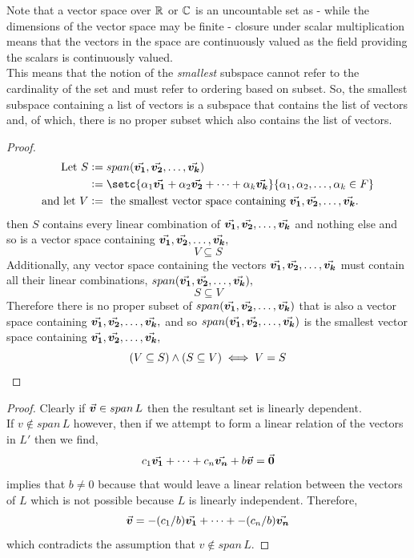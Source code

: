 \documentclass[MathsNotesBase.tex]{subfiles}
\begin{document}
{	\bigskip
	Note that a vector space over $\mathbb{R}^{}$ or $\mathbb{C}^{}$ is an uncountable set as - while the dimensions of the vector space may be finite - closure under scalar multiplication means that the vectors in the space are continuously valued as the field providing the scalars is continuously valued.\\
	This means that the notion of the \emph{smallest} subspace cannot refer to the cardinality of the set and must refer to ordering based on subset. So, the smallest subspace containing a list of vectors is a subspace that contains the list of vectors and, of which, there is no proper subset which also contains the list of vectors.	
	\begin{proof}
		\begin{align*}
		\text{Let } S &:= span(\V{v_1}, \V{v_2}, \dots , \V{v_k})\\
		 &:= \setc{\alpha{_1}\V{v_1} + \alpha{_2}\V{v_2} + \dots + \alpha{_k}\V{v_k}}{\alpha{_1}, \alpha{_2}, \dots , \alpha{_k} \in F}\\
		\text{and let }V &:= \text{ the smallest vector space containing }\V{v_1}, \V{v_2}, \dots , \V{v_k}.	 
		\end{align*}
		then $S$ contains every linear combination of $\vec{\bm{v_1}}, \vec{\bm{v_2}}, \dots , \vec{\bm{v_k}}$ and nothing else and so is a vector space containing $\vec{\bm{v_1}}, \vec{\bm{v_2}}, \dots , \vec{\bm{v_k}},$\\
		\[ V \subseteq S \]
		Additionally, any vector space containing the vectors $\vec{\bm{v_1}}, \vec{\bm{v_2}}, \dots , \vec{\bm{v_k}}$ must contain all their linear combinations, $span(\vec{\bm{v_1}}, \vec{\bm{v_2}}, \dots , \vec{\bm{v_k}}),$\\
		\[ S \subseteq V \]
		Therefore there is no proper subset of $span(\vec{\bm{v_1}}, \vec{\bm{v_2}}, \dots , \vec{\bm{v_k}})$ that is also a vector space containing $\vec{\bm{v_1}}, \vec{\bm{v_2}}, \dots , \vec{\bm{v_k}},$ and so $span(\vec{\bm{v_1}}, \vec{\bm{v_2}}, \dots , \vec{\bm{v_k}})$ is the smallest vector space containing $\vec{\bm{v_1}}, \vec{\bm{v_2}}, \dots , \vec{\bm{v_k}},$\\
		\[ (V \subseteq S) \wedge (S \subseteq V) \iff V = S \qedhere \]
	\end{proof}

	\bigskip
	\begin{proof}
		Clearly if ${ \vec{\bm{v}} \in span\,L }$ then the resultant set is linearly dependent.\\
		If ${ v \not\in span\,L }$ however, then if we attempt to form a linear relation of the vectors in $L'$ then we find,
		\[ c_1\vec{\bm{v_1}} + \dots + c_n\vec{\bm{v_n}} + b\vec{\bm{v}} = \vec{\bm{0}} \]
		implies that ${ b \neq 0 }$ because that would leave a linear relation between the vectors of $L$ which is not possible because $L$ is linearly independent. Therefore,
		\[ \vec{\bm{v}} = -(c_1/b)\vec{\bm{v_1}} + \dots + -(c_n/b)\vec{\bm{v_n}} \]
		which contradicts the assumption that ${ v \not\in span\,L }$.
	\end{proof}
	
}
\end{document}
